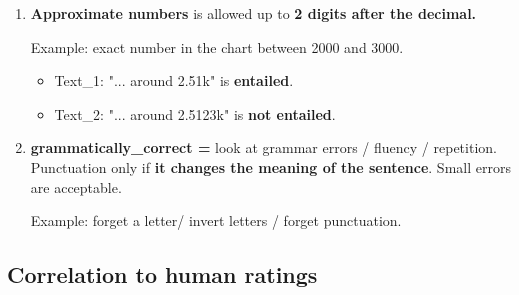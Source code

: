 \begin{enumerate}
    \item \textbf{Approximate numbers} is allowed up to \textbf{2 digits after the decimal.}
    
    Example: exact number in the chart between 2000 and 3000.
    \begin{itemize}
        \item Text\_1: "... around 2.51k" is \textbf{entailed}.
        \item Text\_2: "... around 2.5123k" is \textbf{not entailed}.
    \end{itemize}

    \item \textbf{grammatically\_correct =} look at grammar errors / fluency / repetition. Punctuation only if \textbf{it changes the meaning of the sentence}. Small errors are acceptable.
    
    Example: forget a letter/ invert letters / forget punctuation.
\end{enumerate}
\subsection{Correlation to human ratings}
